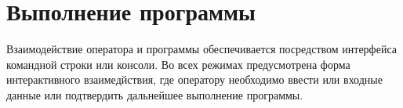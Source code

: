 \newpage
\section{Выполнение программы}

Взаимодействие оператора и программы обеспечивается посредством интерфейса командной строки или консоли.
Во всех режимах предусмотрена форма интерактивного взаимедйствия, где оператору необходимо ввести или входные данные или подтвердить дальнейшее выполнение программы.
